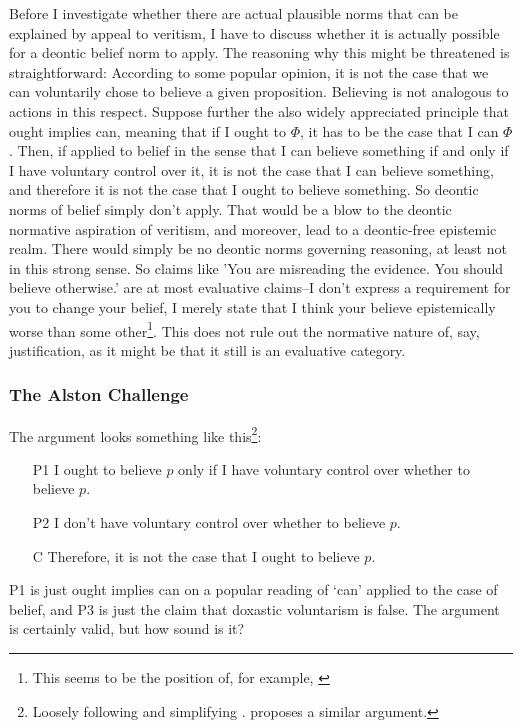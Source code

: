 \documentclass[12pt,numbers=noenddot]{scrartcl}
\begin{document}
Before I investigate whether there are actual plausible norms that can be explained by appeal to veritism, I have to discuss whether it is actually possible for a deontic belief norm to apply. The reasoning why this might be threatened is straightforward: According to some popular opinion, it is not the case that we can voluntarily chose to believe a given proposition. Believing is not analogous to actions in this respect. Suppose further the also widely appreciated principle that ought implies can, meaning that if I ought to $\Phi$, it has to be the case that I can $\Phi$. Then, if applied to belief in the sense that I can believe something if and only if I have voluntary control over it, it is not the case that I can believe something, and therefore it is not the case that I ought to believe something. So deontic norms of belief simply don't apply. That would be a blow to the deontic normative aspiration of veritism, and moreover, lead to a deontic-free epistemic realm. There would simply be no deontic norms governing reasoning, at least not in this strong sense. So claims like 'You are misreading the evidence. You should  believe otherwise.' are at most evaluative claims–I don't express a requirement for you to change your belief, I merely state that I think your believe epistemically worse than some other\footnote{This seems to be the position of, for example, \textcite[241]{grundmann2008}}. This does not rule out the normative nature of, say, justification, as it might be that it still is an evaluative category. 

\subsubsection{The Alston Challenge}

The argument looks something like this\footnote{Loosely following and simplifying \textcite{Alston1988-ALSTDC}. \textcite{Feldman2000-FELTEO-2} proposes a similar argument.}:

\begin{enumerate}
    \item[P1] I ought to believe $p$ only if I have voluntary control over whether to believe $p$.
    \item[P2] I don't have voluntary control over whether to believe $p$.
    \item[C] Therefore, it is not the case that I ought to believe $p$.
\end{enumerate}

P1 is just ought implies can on a popular reading of ‘can’ applied to the case of belief, and P3 is just the claim that doxastic voluntarism is false. The argument is certainly valid, but how sound is it?
\end{document}
